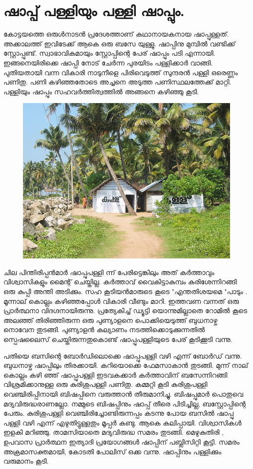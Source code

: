 \documentclass[10pt,a4paper]{report}
\begin{document}
\section{ഷാപ്പ് പള്ളിയും പള്ളി ഷാപ്പും.}
  കോട്ടയത്തെ ഒരുൾനാടൻ പ്രദേശത്താണ് കഥാനായകനായ ഷാപ്പുള്ളത്. അക്കാലത്ത് ഇവിടേക്ക് ആകെ ഒരു ബസേ യുള്ളു. ഷാപ്പിനു മുമ്പിൽ വണ്ടിക്ക് സ്റ്റോപ്പുണ്ട്. സ്വാഭാവികമായും സ്റ്റോപ്പിന്റെ പേര് ഷാപ്പും പടി എന്നായി. ഇങ്ങനെയിരിക്കെ ഷാപ്പി നോട് ചേർന്ന പുരയിടം പള്ളിക്കാർ വാങ്ങി. പുതിയതായി വന്ന വികാരി നാടുനീളെ പിരിവെടുത്ത് സുന്ദരൻ പള്ളി ഒരെണ്ണം പണിതു. പണി കഴിഞ്ഞതോടെ അച്ചനെ അടുത്ത പണിസ്ഥലത്തേക്ക് മാറ്റി. പള്ളിയും ഷാപ്പും സഹവർത്തിത്വത്തിൽ അങ്ങനെ കഴിഞ്ഞു കൂടി. 
   \begin{figure}[H]
  \center
\includegraphics[scale=.45]{images/shapu}
\label{shapu}
\caption{   }
\end{figure}
  
  ചില പിന്തിരിപ്പൻമാർ ഷാപ്പുപള്ളി ന്ന് പേരിട്ടെങ്കിലും അത് കർത്താവും വിശ്വാസികളും മൈന്റ് ചെയ്തില്ല. കർത്താവ് വൈകിട്ടാകുമ്പം കുരിശേന്നിറങ്ങി ഒരു കുപ്പി അന്തി അടിക്കും. സഹ കൂടിയൻമാരുടെ കൂടെ "എന്തതിശയമെ "പാടും . മൂന്നാല് കൊല്ലം കഴിഞ്ഞപ്പോൾ വികാരി വീണ്ടും മാറി. ഇത്തവണ വന്നത് ഒരു പ്രാർത്ഥനാ വിദഗ്ദനായിരുന്നു. പ്രത്യേകിച്ച് ഡ്യൂട്ടി യൊന്നുമില്ലാതെ റോമിൽ കൂടെ അലഞ്ഞ് തിരിഞ്ഞിരുന്ന ഒരു പുണ്യാളനെ പൊക്കിയെടുത്ത് ബുധനാഴ്ച നൊവേന തുടങ്ങി. പുണ്യാളൻ കല്യാണം നടത്തിക്കൊടുക്കുന്നതിൽ സ്പെഷലൈസ് ചെയ്തിരുന്നതുകൊണ്ട് ഷാപ്പുപള്ളിയുടെ പേര് കൂടിക്കൂടി വന്നു.
  
   പതിയെ ബസിന്റെ ബോർഡിലൊക്കെ ഷാപ്പുപള്ളി വഴി എന്ന് ബോർഡ് വന്നു. ബുധനാഴ്ച ഷാപ്പിലും തിരക്കായി. കറിയൊക്കെ ഫേമസാകാൻ തുടങ്ങി. മുന്ന് നാല് കൊല്ലം കഴി ഞ്ഞ് ഷാപ്പുപള്ളി ഇടവകക്കാർ കർത്താവിന് ബസേന്നിറങ്ങി വിശ്രമിക്കാനുള്ള ഒരു കുരിശുപള്ളി പണിതു. കമ്മറ്റി കൂടി കുരിശുപള്ളി വെഞ്ചിരിപ്പിനായി ബിഷപ്പിനെ വരുത്താൻ തീരുമാനിച്ചു. ബിഷപ്പുമാർ പൊതുവെ മദ്യവിരുദ്ധരാണല്ലോ. നമ്മുടെ ബിഷപ്പിനും ഷാപ്പ് തീരെ പിടിച്ചില്ല, ബസ്റ്റോപ്പിന്റെ പേരും. കുരിശുപള്ളി വെഞ്ചിരിച്ചോണ്ടിരുന്നപ്പം കടന്നു പോയ ബസിൽ ഷാപ്പു പള്ളി വഴി എന്ന് എഴുതിട്ടുള്ളതും മൂപ്പർ കണ്ടു. ആകെ കലിപ്പായി. വിശ്വാസികൾ ഇളകി മറിഞ്ഞു. താമസിയാതെ മദ്യവിരുദ്ധ സമരം തുടങ്ങി. മെഴുകുതിരി , ഉപവാസ പ്രാർത്ഥന ഇത്യാദി പ്രയോഗങ്ങൾ ഷാപ്പിന് പബ്ലിസിറ്റി കൂട്ടി. സമരം അക്രമാസക്തമായി, കോടതി പോലിസ് ഒക്ക വന്നു. ഷാപ്പിനും പള്ളിക്കും വരുമാനം കൂടി.
   
\end{document}
